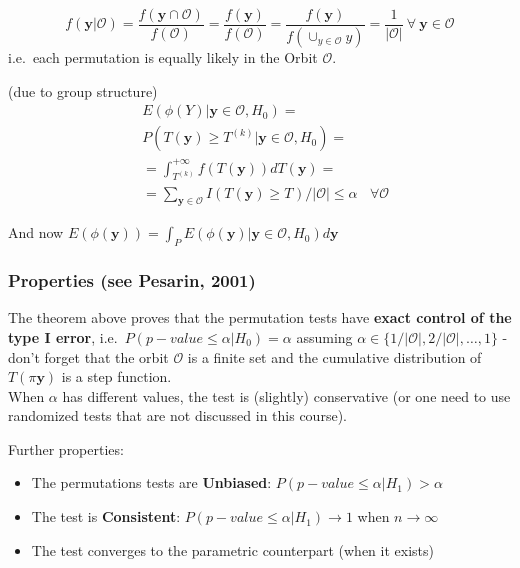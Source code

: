 \documentclass[
]{article}
\providecommand{\tightlist}{%
  \setlength{\itemsep}{0pt}\setlength{\parskip}{0pt}}
\begin{document}
\[f(\mathbf{y}|\mathcal{O})=\frac{f(\mathbf{y}\cap\mathcal{O})}{f(\mathcal{O})}=
\frac{f(\mathbf{y})}{f(\mathcal{O})}=
\frac{f(\mathbf{y})}{f(\cup_{y\in\mathcal{O}}y)}=\frac{1}{|\mathcal{O}|}\ \forall\ \mathbf{y}\in \mathcal{O}\]
i.e.~each permutation is equally likely in the Orbit \(\mathcal{O}\).

(due to group structure) \[
\begin{aligned}
&E(\phi(Y)|\mathbf{y}\in\mathcal{O}, H_0)=\\
&P(T(\mathbf{y})\geq T^{(k)} | \mathbf{y}\in\mathcal{O}, H_0)=\\
&=\int_{T^{(k)}}^{+\infty} f(T(\mathbf{y}))dT(\mathbf{y})=\\
&=\sum_{\mathbf{y}\in\mathcal{O}} I(T(\mathbf{y})\geq T^{})/|\mathcal{O}|\leq \alpha
\ \ \ \ \forall\mathcal{O}
\end{aligned}
\]

And now
\(E(\phi(\mathbf{y}))=\int_P E(\phi(\mathbf{y})|\mathbf{y}\in\mathcal{O}, H_0) d\mathbf{y}\)

\hypertarget{properties-see-pesarin-2001}{%
\subsubsection{Properties (see Pesarin,
2001)}\label{properties-see-pesarin-2001}}

The theorem above proves that the permutation tests have \textbf{exact
control of the type I error}, i.e.~\(P(p-value\leq \alpha|H_0)=\alpha\)
assuming \(\alpha\in \{1/|\mathcal{O}|,2/|\mathcal{O}|,\ldots,1\}\) -
don't forget that the orbit \(\mathcal{O}\) is a finite set and the
cumulative distribution of \(T(\pi \mathbf{y})\) is a step function.\\
When \(\alpha\) has different values, the test is (slightly)
conservative (or one need to use randomized tests that are not discussed
in this course).

Further properties:

\begin{itemize}
\tightlist
\item
  The permutations tests are \textbf{Unbiased}:
  \(P(p-value\leq \alpha|H_1)>\alpha\)\\
\item
  The test is \textbf{Consistent}: \(P(p-value\leq \alpha|H_1)\to 1\)
  when \(n\to\infty\)\\
\item
  The test converges to the parametric counterpart (when it exists)
\end{itemize}
\end{document}
